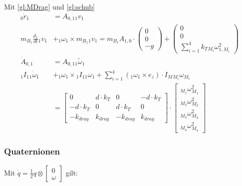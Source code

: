 Mit \ref{gl:MDrag} und \ref{gl:schub}
\begin{align}
    {_{0}\dot{r}_{1}} &= A_{0, 1} {_{1}v_{1}} \\
    m_{B_1} \frac{d_1}{dt} {_{1}v_{1}} &+ {_{1}\omega_{1}} \times m_{B_1} {_{1}v_{1}} = m_{B_1} A_{1, 0} \cdot \begin{pmatrix} 0 \\ 0 \\ -g \end{pmatrix} + {\begin{pmatrix} 0 \\ 0 \\ \sum_{i = 1}^4 k_{T} {_{M_i}\omega^2_{1, M_i}} \end{pmatrix}} \\
    {{\dot{A}_{0, 1}}} &= {A_{0, 1}} \tilde{_{1} {\omega}_{1}}\\
    {_{1} I_{1}} {_{1} \dot{\omega}_{1}} &+ {_{1} {\omega}_{1}} \times {_{1} I_{1}} {_{1} {\omega}_{1}} + \sum_{i=1}^{4}{({_{1}{\omega}_{1}} \times e_z) \cdot I_{M} {_{M_i}\omega_{M_i}} } \\
    &= \begin{bmatrix} 0              & d \cdot k_{T} & 0             & -d \cdot k_{T} \\ 
                       -d \cdot k_{T} & 0             & d \cdot k_{T} & 0  \\
                       -k_{drag}      & k_{drag}      & -k_{drag}    & k_{drag}
       \end{bmatrix}
    \cdot 
    \begin{bmatrix}
      {_{M_1} {\omega}^2_{M_1}} \\
      {_{M_2} {\omega}^2_{M_2}}\\
      {_{M_3} {\omega}^2_{M_3}}\\
      {_{M_4} {\omega}^2_{M_4}}
    \end{bmatrix}
\end{align}
\subsubsection{Quaternionen}\label{subsub:Quaternionen}
Mit $\dot q = \frac{1}{2} q \otimes \begin{bmatrix} 0 \\ \omega \end{bmatrix} $ gilt:

